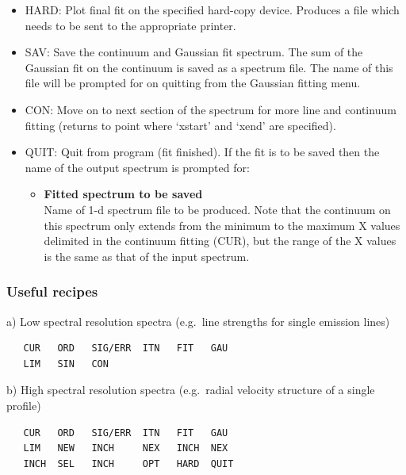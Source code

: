 \begin{itemize}
\item
   HARD: Plot final fit on the specified hard-copy device. Produces a
   file which needs to be sent to the appropriate printer.

\item
   SAV: Save the continuum and Gaussian fit spectrum. The sum of the
   Gaussian fit on the continuum is saved as a spectrum file. The name
   of this file will be prompted for on quitting from the Gaussian
   fitting menu.

\item
   CON: Move on to next section of the spectrum for more line and
   continuum fitting (returns to point where `xstart' and `xend' are
   specified).

\item
   QUIT: Quit from program (fit finished).  If the fit is to be saved
   then the name of the output spectrum is prompted for:

\begin{itemize}
\item{\bf Fitted spectrum to be saved}\ \\
      Name of 1-d spectrum file to be produced. Note that the continuum
      on this spectrum only extends from the minimum to the maximum X values
      delimited in the continuum fitting (CUR), but the range of the X values
      is the same as that of the input spectrum.
\end{itemize}

\end{itemize}


\subsubsection{\label{techno12recipes}Useful recipes}

   a) Low spectral resolution spectra (e.g.\ line strengths for single
   emission lines)

\begin{verbatim}
   CUR   ORD   SIG/ERR  ITN   FIT   GAU
   LIM   SIN   CON
\end{verbatim}

   b) High spectral resolution spectra (e.g.\ radial velocity structure of
   a single profile)

\begin{verbatim}
   CUR   ORD   SIG/ERR  ITN   FIT   GAU
   LIM   NEW   INCH     NEX   INCH  NEX
   INCH  SEL   INCH     OPT   HARD  QUIT
\end{verbatim}

